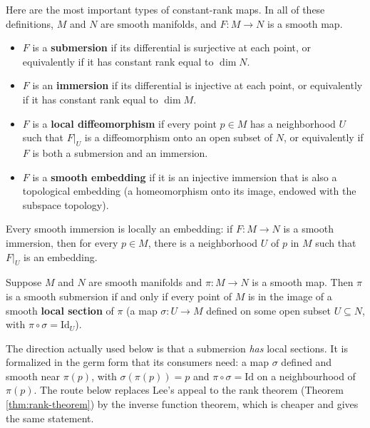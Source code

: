 Here are the most important types of constant-rank maps. In all of these definitions, $M$ and $N$ are smooth manifolds, and $F: M \to N$ is a smooth map.

\begin{itemize}
\item $F$ is a \textbf{submersion} if its differential is surjective at each point, or equivalently if it has constant rank equal to $\dim N$.
\item $F$ is an \textbf{immersion} if its differential is injective at each point, or equivalently if it has constant rank equal to $\dim M$.
\item $F$ is a \textbf{local diffeomorphism} if every point $p \in M$ has a neighborhood $U$ such that $F|_U$ is a diffeomorphism onto an open subset of $N$, or equivalently if $F$ is both a submersion and an immersion.
\item $F$ is a \textbf{smooth embedding} if it is an injective immersion that is also a topological embedding (a homeomorphism onto its image, endowed with the subspace topology).
\end{itemize}

\begin{theorem}
\label{thm:local-embedding-theorem}
Every smooth immersion is locally an embedding: if $F: M \to N$ is a smooth immersion, then for every $p \in M$, there is a neighborhood $U$ of $p$ in $M$ such that $F|_U$ is an embedding.
\end{theorem}

\begin{theorem}
\label{thm:local-section-theorem}
Suppose $M$ and $N$ are smooth manifolds and $\pi: M \to N$ is a smooth map. Then $\pi$ is a smooth submersion if and only if every point of $M$ is in the image of a smooth \textbf{local section} of $\pi$ (a map $\sigma: U \to M$ defined on some open subset $U \subseteq N$, with $\pi \circ \sigma = \text{Id}_U$).
\end{theorem}

The direction actually used below is that a submersion \emph{has} local sections. It is formalized in the germ form that its consumers need: a map $\sigma$ defined and smooth near $\pi(p)$, with $\sigma(\pi(p)) = p$ and $\pi \circ \sigma = \mathrm{Id}$ on a neighbourhood of $\pi(p)$. The route below replaces Lee's appeal to the rank theorem (Theorem \ref{thm:rank-theorem}) by the inverse function theorem, which is cheaper and gives the same statement.

